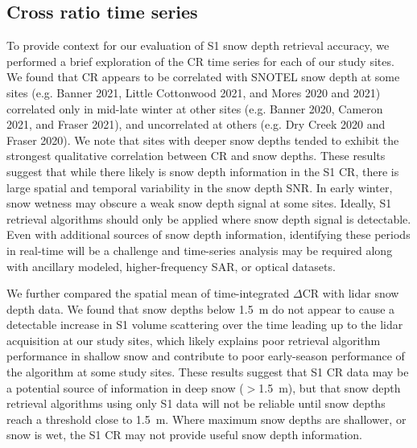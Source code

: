 \documentclass[journal abbreviation, manuscript]{copernicus}
\begin{document}

\subsection{Cross ratio time series}

To provide context for our evaluation of S1 snow depth retrieval accuracy, we performed a brief exploration of the CR time series for each of our study sites. We found that CR appears to be correlated with SNOTEL snow depth at some sites (e.g. Banner 2021, Little Cottonwood 2021, and Mores 2020 and 2021) correlated only in mid-late winter at other sites (e.g. Banner 2020, Cameron 2021, and Fraser 2021), and uncorrelated at others (e.g. Dry Creek 2020 and Fraser 2020). We note that sites with deeper snow depths tended to exhibit the strongest qualitative correlation between CR and snow depths. These results suggest that while there likely is snow depth information in the S1 CR, there is large spatial and temporal variability in the snow depth SNR. In early winter, snow wetness may obscure a weak snow depth signal at some sites. Ideally, S1 retrieval algorithms should only be applied where snow depth signal is detectable. Even with additional sources of snow depth information, identifying these periods in real-time will be a challenge and time-series analysis may be required along with ancillary modeled, higher-frequency SAR, or optical datasets. 

We further compared the spatial mean of time-integrated $\Delta$CR with lidar snow depth data. We found that snow depths below 1.5~m do not appear to cause a detectable increase in S1 volume scattering over the time leading up to the lidar acquisition at our study sites, which likely explains poor retrieval algorithm performance in shallow snow and contribute to poor early-season performance of the algorithm at some study sites. These results suggest that S1 CR data may be a potential source of information in deep snow ($>$1.5~m), but that snow depth retrieval algorithms using only S1 data will not be reliable until snow depths reach a threshold close to 1.5~m. Where maximum snow depths are shallower, or snow is wet, the S1 CR may not provide useful snow depth information. 
\end{document}
